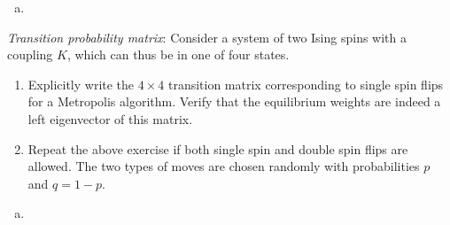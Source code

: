 \begin{solution}
    \begin{enumerate}[(a)]
        \item
    \end{enumerate}
\end{solution}

\begin{problem}
    \textit{Transition probability matrix}: Consider a system of two Ising spins with a coupling $K$, which can thus be in one of four states.

    \begin{enumerate}
        \item[(a)] Explicitly write the $4\times 4$ transition matrix corresponding to single spin flips for a Metropolis algorithm. Verify that the equilibrium weights are indeed a left eigenvector of this matrix.

        \item[(b)] Repeat the above exercise if both single spin and double spin flips are allowed. The two types of moves are chosen randomly with probabilities $p$ and $q = 1 - p$.
    \end{enumerate}
\end{problem}

\begin{solution}
    \begin{enumerate}[(a)]
        \item
    \end{enumerate}
\end{solution}
